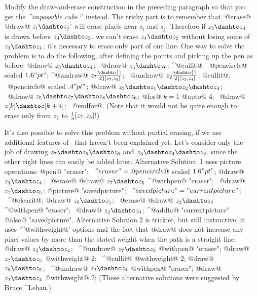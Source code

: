 {{{{\dangerexercise Modify the draw-and-erase construction in the preceding
paragraph so that you get the {\sl^{impossible cube}\/}
`\thinspace{\manual\cubeb}\thinspace' instead.
\answer The tricky part is to remember that `@erase@ @draw@ $z_i\dashto z_j$'
will erase pixels near $z_i$ and $z_j$. Therefore if $z_3\dashto z_4$ is
drawn before $z_4\dashto z_2$, we can't erase $z_4\dashto z_2$ without losing
some of $z_3\dashto z_4$; it's necessary to erase only part of one line.
One way to solve the problem is to do the following, after defining the
points and picking up the pen as before:
\begindisplay
@draw@ $z_3\dashto z_4$; \ @draw@ $z_5\dashto z_6$;\cr
^@cullit@; \ \pickup @pencircle@ scaled $1.6"pt"$;\cr
^@undraw@ $z_7\dashto {1\over2}[z_7,z_5]$; \
 @undraw@ $z_2\dashto {1\over2}[z_2,z_4]$;\cr
@cullit@; \ \pickup @pencircle@ scaled $.4"pt"$;\cr
@draw@ $z_3\dashto z_1\dashto z_2\dashto z_4$; \
 @draw@ $z_5\dashto z_7\dashto z_8\dashto z_6$;\cr
@for@ $k=1$ @upto@ 4: \ @draw@ $z[k]\dashto z[k+4]$; \ @endfor@.\cr
\enddisplay
(Note that it would not be quite enough to erase only from $z_7$ to
${1\over3}[z_7,z_5]$!)\par
It's also possible to solve this problem without partial erasing, if we
use additional features of \MF\ that haven't been explained yet. Let's
consider only the job of drawing $z_7\dashto z_5\dashto z_6$ and
$z_3\dashto z_4\dashto z_2$, since the other eight lines can easily be
added later. Alternative Solution~1 uses picture operations:
\begindisplay
@pen@ "eraser"; \ $"eraser"=@pencircle@$ scaled $1.6"pt"$;\cr
@draw@ $z_3\dashto z_4$; \
@erase@ @draw@ $z_7\dashto z_5$ ^@withpen@ "eraser"; \
@draw@ $z_7\dashto z_5$;\cr
@picture@ "savedpicture"; \ $"savedpicture"="currentpicture"$; \ ^@clearit@;\cr
@draw@ $z_6\dashto z_5$; \
@erase@ @draw@ $z_2\dashto z_4$ ^@withpen@ "eraser"; \
@draw@ $z_2\dashto z_4$;\cr
^@addto@ "currentpicture" @also@ "savedpicture".\cr
\enddisplay
Alternative Solution 2 is trickier, but still instructive; it uses
`^@withweight@' options and the fact that @draw@ does not increase any
pixel values by more than the stated weight when the path is a straight
line:
\begindisplay
@draw@ $z_3\dashto z_4$; \
^@undraw@ $z_7\dashto z_5$ @withpen@ "eraser";\cr
@draw@ $z_7\dashto z_5$ @withweight@ 2; \
^@cullit@ @withweight@ 2;\cr
@draw@ $z_6\dashto z_5$; \
^@undraw@ $z_2\dashto z_4$ @withpen@ "eraser";\cr
@draw@ $z_2\dashto z_4$ @withweight@ 2;\cr
\enddisplay
(These alternative solutions were suggested by Bruce ^{Leban}.)

}}}}
